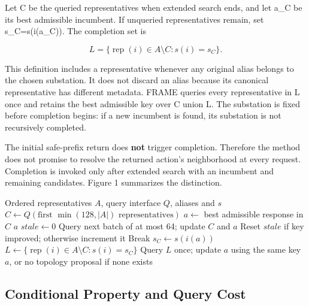 Let C be the queried representatives when extended search ends, and let a\_C be its best admissible incumbent. If unqueried representatives remain, set s\_C=s(i(a\_C)). The completion set is


\begin{equation}
L=\{\operatorname{rep}(i)\in A\setminus C:s(i)=s_C\}.
\end{equation}

This definition includes a representative whenever any original alias belongs to the chosen substation. It does not discard an alias because its canonical representative has different metadata. FRAME queries every representative in L once and retains the best admissible key over C union L. The substation is fixed before completion begins: if a new incumbent is found, its substation is not recursively completed.


The initial safe-prefix return does \textbf{not} trigger completion. Therefore the method does not promise to resolve the returned action's neighborhood at every request. Completion is invoked only after extended search with an incumbent and remaining candidates. Figure 1 summarizes the distinction.


\begin{algorithm}[t]
\caption{Progressive Search with Substation Completion (FRAME)}
\label{alg:frame}
\begin{algorithmic}[1]
\REQUIRE Ordered representatives $A$, query interface $Q$, aliases and $s$
\STATE $C\gets Q(\text{first }\min(128,|A|)\text{ representatives})$
\STATE $a\gets$ best admissible response in $C$
  \RETURN $a$
\ENDIF
\STATE $stale\gets 0$
  \STATE Query next batch of at most 64; update $C$ and $a$
  \STATE Reset $stale$ if key improved; otherwise increment it
    \STATE Break
  \ENDIF
\ENDWHILE
{}
  \STATE $s_C\gets s(i(a))$
  \STATE $L\gets\{\operatorname{rep}(i)\in A\setminus C:s(i)=s_C\}$
  \STATE Query $L$ once; update $a$ using the same key
\ENDIF
\RETURN $a$, or no topology proposal if none exists
\end{algorithmic}
\end{algorithm}

\subsection{Conditional Property and Query Cost}

